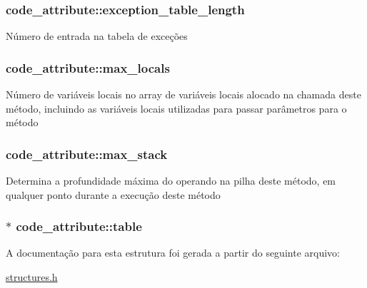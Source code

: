 \subsubsection[{\texorpdfstring{exception\+\_\+table\+\_\+length}{exception_table_length}}]{ code\+\_\+attribute\+::exception\+\_\+table\+\_\+length}\hypertarget{structcode__attribute_ab84a776a1bdeb79fde3b47279d8e12e4}{}\label{structcode__attribute_ab84a776a1bdeb79fde3b47279d8e12e4}
Número de entrada na tabela de exceções 
\subsubsection[{\texorpdfstring{max\+\_\+locals}{max_locals}}]{ code\+\_\+attribute\+::max\+\_\+locals}\hypertarget{structcode__attribute_ab75487f3c1d38f9fb6ad5e71ab99dea2}{}\label{structcode__attribute_ab75487f3c1d38f9fb6ad5e71ab99dea2}
Número de variáveis locais no array de variáveis locais alocado na chamada deste método, incluindo as variáveis locais utilizadas para passar parâmetros para o método 
\subsubsection[{\texorpdfstring{max\+\_\+stack}{max_stack}}]{ code\+\_\+attribute\+::max\+\_\+stack}\hypertarget{structcode__attribute_abd4d398c165a4e91f3ea559808931473}{}\label{structcode__attribute_abd4d398c165a4e91f3ea559808931473}
Determina a profundidade máxima do operando na pilha deste método, em qualquer ponto durante a execução deste método 
\subsubsection[{\texorpdfstring{table}{table}}]{$\ast$ code\+\_\+attribute\+::table}\hypertarget{structcode__attribute_a8bdff0149755249696a5d6aa288d7a98}{}\label{structcode__attribute_a8bdff0149755249696a5d6aa288d7a98}


A documentação para esta estrutura foi gerada a partir do seguinte arquivo\+:\begin{DoxyCompactItemize}
\item 
\hyperlink{structures_8h}{structures.\+h}\end{DoxyCompactItemize}
